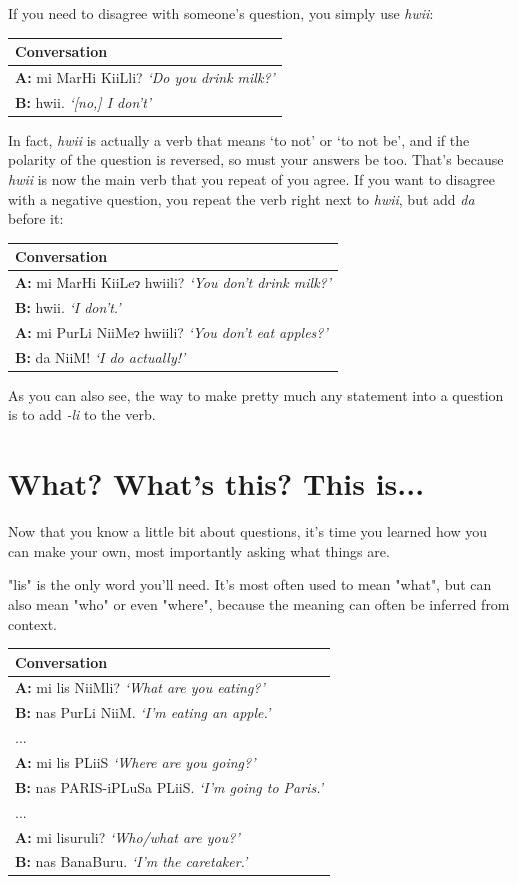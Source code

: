 \documentclass[a5paper,10pt,twoside,openright]{memoir}
\newcommand{\lilglot}{ɂ}
\newcommand\famword[1]{{\addfontfeatures{Letters=UppercaseSmallCaps}#1}}
\newenvironment{conversation}
    {\begin{table}[ht]
        \begin{tabular}{p{0.962\textwidth}}
        \toprule
        \textbf{Conversation} \\
        \midrule
    }
    { 
        \bottomrule
        \end{tabular}
    \end{table}
    }
\newcommand{\diagline}[3]{\hspace{1em} \textbf{\uppercase{#1:}} {#2} \textit{`#3'} \\}
\begin{document}
If you need to disagree with someone's question, you simply use \emph{hwii}:

\begin{conversation}
    \diagline{a}{\famword{mi MarHi KiiLli?}}{Do you drink milk?}
    \diagline{b}{hwii.}{[no,] I don't}
\end{conversation}

In fact, \emph{hwii} is actually a verb that means `to not' or `to not be', and if the polarity of the question is reversed, so must your answers be too. That's because \emph{hwii} is now the main verb that you repeat of you agree. If you want to disagree with a negative question, you repeat the verb right next to \emph{hwii}, but add \emph{da} before it:

\begin{conversation}
    \diagline{a}{\famword{mi MarHi KiiLe\lilglot{} hwiili?}}{You don't drink milk?}
    \diagline{b}{hwii.}{I don't.}
    \diagline{a}{\famword{mi PurLi NiiMe\lilglot{} hwiili?}}{You don't eat apples?}
    \diagline{b}{\famword{da NiiM!}}{I do actually!}
\end{conversation}

As you can also see, the way to make pretty much any statement into a question is to add \emph{-li} to the verb. 

\chapter{What? What's this? This is...}

Now that you know a little bit about questions, it's time you learned how you can make your own, most importantly asking what things are. 

"lis" is the only word you'll need. It's most often used to mean "what", but can also mean "who" or even "where", because the meaning can often be inferred from context.

\begin{conversation}
    \diagline{a}{\famword{mi lis NiiMli?}}{What are you eating?}
    \diagline{b}{\famword{nas PurLi NiiM.}}{I'm eating an apple.}
    \hspace{1.5em}...\\
    \diagline{a}{\famword{mi lis PLiiS}}{Where are you going?}
    \diagline{b}{\famword{nas PARIS-iPLuSa PLiiS.}}{I'm going to Paris.}
    \hspace{1.5em}...\\
    \diagline{a}{mi lisuruli?}{Who/what are you?}
    \diagline{b}{\famword{nas BanaBuru.}}{I'm the caretaker.}
\end{conversation}
\end{document}
